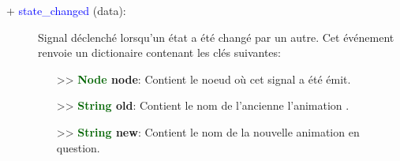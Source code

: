 \documentclass[a4paper, 11pt]{article}
\begin{document}
	\begin{description}
		\item [+ \textcolor{blue}{state\_changed} (data):] Signal déclenché lorsqu'un état a été changé par 
		un autre. Cet événement renvoie un dictionaire contenant les clés suivantes:
		\begin{itemize}
			\item [>> \textbf{\textcolor{darkgreen}{Node} node}:] Contient le noeud où cet signal a été 
			émit.
			\item [>> \textbf{\textcolor{darkgreen}{String} old}:] Contient le nom de l'ancienne l'animation 
			.
			\item [>> \textbf{\textcolor{darkgreen}{String} new}:] Contient le nom de la nouvelle animation 
			en question.\\
		\end{itemize}
	\end{description}
\end{document}
